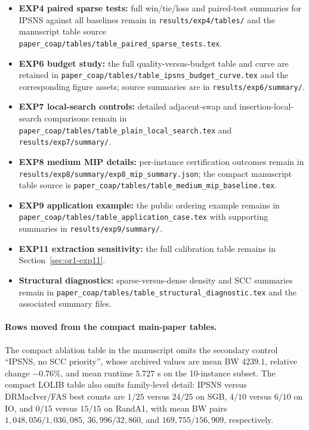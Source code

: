 \begin{itemize}
  \item \textbf{EXP4 paired sparse tests:} full win/tie/loss and paired-test summaries for IPSNS against all baselines remain in \texttt{results/exp4/tables/} and the manuscript table source \texttt{paper\_coap/tables/table\_paired\_sparse\_tests.tex}.
  \item \textbf{EXP6 budget study:} the full quality-versus-budget table and curve are retained in \texttt{paper\_coap/tables/table\_ipsns\_budget\_curve.tex} and the corresponding figure assets; source summaries are in \texttt{results/exp6/summary/}.
  \item \textbf{EXP7 local-search controls:} detailed adjacent-swap and insertion-local-search comparisons remain in \texttt{paper\_coap/tables/table\_plain\_local\_search.tex} and \texttt{results/exp7/summary/}.
  \item \textbf{EXP8 medium MIP details:} per-instance certification outcomes remain in \texttt{results/exp8/summary/exp8\_mip\_summary.json}; the compact manuscript table source is \texttt{paper\_coap/tables/table\_medium\_mip\_baseline.tex}.
  \item \textbf{EXP9 application example:} the public ordering example remains in \texttt{paper\_coap/tables/table\_application\_case.tex} with supporting summaries in \texttt{results/exp9/summary/}.
  \item \textbf{EXP11 extraction sensitivity:} the full calibration table remains in Section~\ref{sec:or1-exp11}.
  \item \textbf{Structural diagnostics:} sparse-versus-dense density and SCC summaries remain in \texttt{paper\_coap/tables/table\_structural\_diagnostic.tex} and the associated summary files.
\end{itemize}

\paragraph{Rows moved from the compact main-paper tables.}
The compact ablation table in the manuscript omits the secondary control ``IPSNS, no SCC priority'', whose archived values are mean BW \(4239.1\), relative change \(-0.76\%\), and mean runtime \(5.727\) s on the 10-instance subset. The compact LOLIB table also omits family-level detail: IPSNS versus DRMacIver/FAS best counts are \(1/25\) versus \(24/25\) on SGB, \(4/10\) versus \(6/10\) on IO, and \(0/15\) versus \(15/15\) on RandA1, with mean BW pairs \(1{,}048{,}056 / 1{,}036{,}085\), \(36{,}996 / 32{,}860\), and \(169{,}755 / 156{,}909\), respectively.

